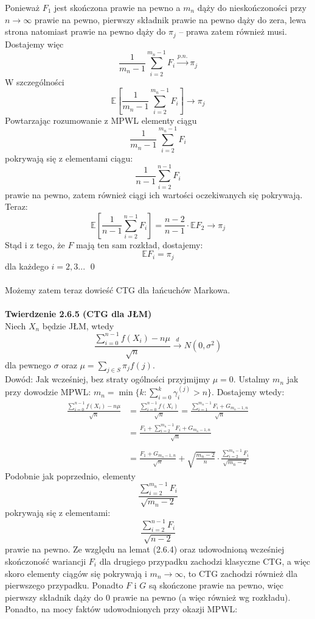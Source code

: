 \documentclass[a4paper]{article}
\begin{document}
Ponieważ $F_1$ jest skończona prawie na pewno a $m_n$ dąży do nieskończoności przy $n \to \infty$ prawie na pewno, pierwszy składnik prawie na pewno dąży do zera, lewa strona natomiast prawie na pewno dąży do $\pi_j$ – prawa zatem również musi. Dostajemy więc
$$\frac{1}{m_n - 1} \sum\limits_{i = 2}^{m_n - 1} F_i \overset{p.n.}{\to} \pi_j$$
W szczególności
$$\mathbb{E}\left[\frac{1}{m_n - 1} \sum\limits_{i = 2}^{m_n - 1} F_i\right] \to \pi_j$$
Powtarzając rozumowanie z MPWL elementy ciągu
$$\frac{1}{m_n - 1} \sum\limits_{i = 2}^{m_n - 1} F_i$$
pokrywają się z elementami ciągu:
$$\frac{1}{n - 1} \sum\limits_{i = 2}^{n - 1} F_i$$
prawie na pewno, zatem również ciągi ich wartości oczekiwanych się pokrywają. Teraz:
$$\mathbb{E}\left[\frac{1}{n - 1} \sum\limits_{i = 2}^{n - 1} F_i\right] = \frac{n-2}{n - 1}\cdot \mathbb{E}F_2 \to \pi_j$$
Stąd i z tego, że $F$ mają ten sam rozkład, dostajemy:
$$\mathbb{E}F_i = \pi_j$$
dla każdego $i = 2,3...$ \qed
\\\\
Możemy zatem teraz dowieść CTG dla łańcuchów Markowa.\\
\\
\textbf{Twierdzenie 2.6.5 (CTG dla JŁM)}\\
Niech $X_n$ będzie JŁM, wtedy
$$ \frac{\sum\limits_{i=0}^{n-1} f(X_i) - n\mu}{\sqrt{n}} \overset{d}{\to} N(0, \sigma^2)$$
dla pewnego $\sigma$ oraz $\mu = \sum\limits_{j \in S} \pi_j f(j)$. \\
Dowód: Jak wcześniej, bez straty ogólności przyjmijmy $\mu = 0$. Ustalmy $m_n$ jak przy dowodzie MPWL:
$m_n = \min \{k: \sum\limits_{i=0}^k \gamma_i^{(j)} > n\}$. Dostajemy wtedy:
\begin{align*}
    \frac{\sum\limits_{i=0}^{n-1} f(X_i) - n\mu}{\sqrt{n}} &= \frac{\sum\limits_{i=0}^{n-1} f(X_i)}{\sqrt{n}} = \frac{\sum\limits_{i=1}^{m_n-1} F_i + G_{m_n-1, n}}{\sqrt{n}}\\
    &= \frac{F_1 + \sum\limits_{i=2}^{m_n-1} F_i + G_{m_n-1, n}}{\sqrt{n}}\\\\
    &= \frac{F_1 + G_{m_n-1, n}}{\sqrt{n}} + \sqrt{\frac{m_n -2}{n}} \cdot \frac{\sum\limits_{i=2}^{m_n-1} F_i }{\sqrt{m_n-2}}
\end{align*}
Podobnie jak poprzednio, elementy $$\frac{\sum\limits_{i=2}^{m_n-1} F_i }{\sqrt{m_n-2}}$$
pokrywają się z elementami:
$$\frac{\sum\limits_{i=2}^{n-1} F_i }{\sqrt{n-2}}$$
prawie na pewno. Ze względu na lemat (2.6.4) oraz udowodnioną wcześniej skończoność wariancji $F_i$ dla drugiego przypadku zachodzi klasyczne CTG, a więc skoro elementy ciągów się pokrywają i $m_n \to \infty$, to CTG zachodzi również dla pierwszego przypadku. Ponadto $F$ i $G$ są skończone prawie na pewno, więc pierwszy składnik dąży do 0 prawie na pewno (a więc również wg rozkładu). Ponadto, na mocy faktów udowodnionych przy okazji MPWL:
\end{document}
